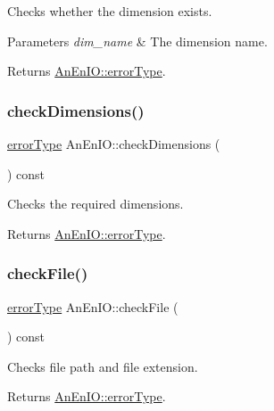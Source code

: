 Checks whether the dimension exists.


\begin{DoxyParams}{Parameters}
{\em dim\+\_\+name} & The dimension name. \\
\hline
\end{DoxyParams}
\begin{DoxyReturn}{Returns}
\mbox{\hyperlink{class_an_en_i_o_aa56bc1ec6610b86db4349bce20f9ead0}{An\+En\+I\+O\+::error\+Type}}. 
\end{DoxyReturn}
\mbox{\label{class_an_en_i_o_ab6cd06f6402655924002fec4f83195eb}} 
\subsubsection{\texorpdfstring{check\+Dimensions()}{checkDimensions()}}
{\footnotesize\ttfamily \mbox{\hyperlink{class_an_en_i_o_aa56bc1ec6610b86db4349bce20f9ead0}{error\+Type}} An\+En\+I\+O\+::check\+Dimensions (\begin{DoxyParamCaption}{ }\end{DoxyParamCaption}) const}

Checks the required dimensions. \begin{DoxyReturn}{Returns}
\mbox{\hyperlink{class_an_en_i_o_aa56bc1ec6610b86db4349bce20f9ead0}{An\+En\+I\+O\+::error\+Type}}. 
\end{DoxyReturn}
\mbox{\label{class_an_en_i_o_adf0b96d441687159e1d884273847d68e}} 
\subsubsection{\texorpdfstring{check\+File()}{checkFile()}}
{\footnotesize\ttfamily \mbox{\hyperlink{class_an_en_i_o_aa56bc1ec6610b86db4349bce20f9ead0}{error\+Type}} An\+En\+I\+O\+::check\+File (\begin{DoxyParamCaption}{ }\end{DoxyParamCaption}) const}

Checks file path and file extension.

\begin{DoxyReturn}{Returns}
\mbox{\hyperlink{class_an_en_i_o_aa56bc1ec6610b86db4349bce20f9ead0}{An\+En\+I\+O\+::error\+Type}}. 
\end{DoxyReturn}
\mbox{\label{class_an_en_i_o_aa9b4700db58d0ef09af429d5d31ff55f}} 
